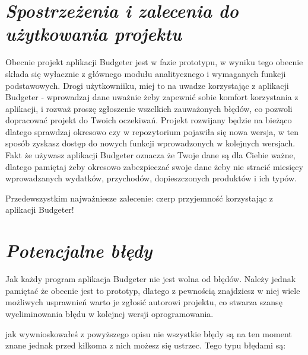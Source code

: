 \documentclass[a4paper,10pt, twoside]{report}
\newcommand{\customstylesection}[1]{\textbf{\textit{#1}}}
\begin{document}
\section{\customstylesection{Spostrzeżenia i zalecenia do użytkowania projektu}}
{Obecnie projekt aplikacji Budgeter jest w fazie prototypu, w wyniku tego 
obecnie składa się wyłacznie z głównego modułu analitycznego i wymaganych 
funkcji podstawowych. Drogi użytkowniiku, miej to na uwadze korzystając z 
aplikacji Budgeter - wprowadzaj dane uważnie żeby zapewnić sobie komfort 
korzystania z aplikacji, i rozważ proszę zgłoszenie wszelkich zauważonych 
błędów, co pozwoli dopracować projekt do Twoich oczekiwań. Projekt rozwijany 
będzie na bieżąco dlatego sprawdzaj okresowo czy w repozytorium pojawiła się 
nowa wersja, w ten sposób zyskasz dostęp do nowych funkcji wprowadzonych w 
kolejnych wersjach. Fakt że używasz aplikacji Budgeter oznacza że Twoje dane są 
dla Ciebie ważne, dlatego pamiętaj żeby okresowo zabezpieczać swoje dane żeby 
nie stracić miesięcy wprowadzanych wydatków, przychodów, dopieszczonych 
produktów i ich typów.}

{Przedewszystkim najważniesze zalecenie: czerp przyjemność korzystając z 
aplikacji Budgeter!}

\section{\customstylesection{Potencjalne błędy}}
{Jak każdy program aplikacja Budgeter nie jest wolna od błędów. Należy jednak 
pamiętać że obecnie jest to prototyp, dlatego z pewnością znajdziesz w niej 
wiele możliwych usprawnień warto je zgłosić autorowi projektu, co stwarza szansę
 wyeliminowania błędu w kolejnej wersji oprogramowania.}

{jak wywnioskowałeś z powyższego opisu nie wszystkie błędy są na ten moment 
znane jednak przed kilkoma z nich możesz się ustrzec. Tego typu błędami są:}
\end{document}
